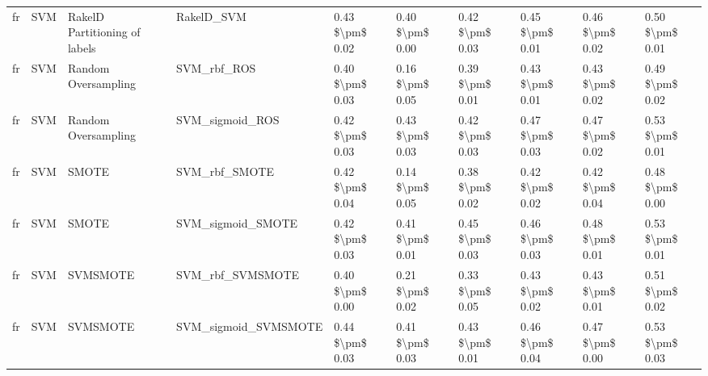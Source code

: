 \begin{tabular}{llllllllll}
      fr &                             SVM & RakelD Partitioning of labels &                                   RakelD\_SVM & 0.43 \$\textbackslash pm\$ 0.02 &           0.40 \$\textbackslash pm\$ 0.00 &       0.42 \$\textbackslash pm\$ 0.03 &        0.45 \$\textbackslash pm\$ 0.01 &                         0.46 \$\textbackslash pm\$ 0.02 &     0.50 \$\textbackslash pm\$ 0.01 \\
      fr &                             SVM &           Random Oversampling &                                  SVM\_rbf\_ROS & 0.40 \$\textbackslash pm\$ 0.03 &           0.16 \$\textbackslash pm\$ 0.05 &       0.39 \$\textbackslash pm\$ 0.01 &        0.43 \$\textbackslash pm\$ 0.01 &                         0.43 \$\textbackslash pm\$ 0.02 &     0.49 \$\textbackslash pm\$ 0.02 \\
      fr &                             SVM &           Random Oversampling &                              SVM\_sigmoid\_ROS & 0.42 \$\textbackslash pm\$ 0.03 &           0.43 \$\textbackslash pm\$ 0.03 &       0.42 \$\textbackslash pm\$ 0.03 &        0.47 \$\textbackslash pm\$ 0.03 &                         0.47 \$\textbackslash pm\$ 0.02 &     0.53 \$\textbackslash pm\$ 0.01 \\
      fr &                             SVM &                         SMOTE &                                SVM\_rbf\_SMOTE & 0.42 \$\textbackslash pm\$ 0.04 &           0.14 \$\textbackslash pm\$ 0.05 &       0.38 \$\textbackslash pm\$ 0.02 &        0.42 \$\textbackslash pm\$ 0.02 &                         0.42 \$\textbackslash pm\$ 0.04 &     0.48 \$\textbackslash pm\$ 0.00 \\
      fr &                             SVM &                         SMOTE &                            SVM\_sigmoid\_SMOTE & 0.42 \$\textbackslash pm\$ 0.03 &           0.41 \$\textbackslash pm\$ 0.01 &       0.45 \$\textbackslash pm\$ 0.03 &        0.46 \$\textbackslash pm\$ 0.03 &                         0.48 \$\textbackslash pm\$ 0.01 &     0.53 \$\textbackslash pm\$ 0.01 \\
      fr &                             SVM &                      SVMSMOTE &                             SVM\_rbf\_SVMSMOTE & 0.40 \$\textbackslash pm\$ 0.00 &           0.21 \$\textbackslash pm\$ 0.02 &       0.33 \$\textbackslash pm\$ 0.05 &        0.43 \$\textbackslash pm\$ 0.02 &                         0.43 \$\textbackslash pm\$ 0.01 &     0.51 \$\textbackslash pm\$ 0.02 \\
      fr &                             SVM &                      SVMSMOTE &                         SVM\_sigmoid\_SVMSMOTE & 0.44 \$\textbackslash pm\$ 0.03 &           0.41 \$\textbackslash pm\$ 0.03 &       0.43 \$\textbackslash pm\$ 0.01 &        0.46 \$\textbackslash pm\$ 0.04 &                         0.47 \$\textbackslash pm\$ 0.00 &     0.53 \$\textbackslash pm\$ 0.03 \\

\end{tabular}
